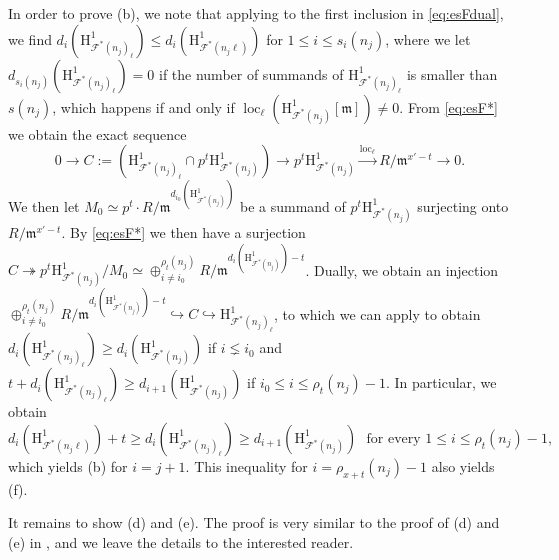 \documentclass[10pt,reqno]{amsart}
\numberwithin{equation}{section}
\theoremstyle{plain}
\theoremstyle{definition}
\theoremstyle{definition}
\theoremstyle{plain}
\theoremstyle{plain}
\theoremstyle{plain}
\theoremstyle{plain}
\theoremstyle{plain}
\theoremstyle{plain}
\DeclareMathOperator{\loc}{loc}
\newcommand{\Fcal}{\mathcal{F}}
\newcommand{\fm}{\mathfrak{m}}
\newcommand{\rH}{\mathrm{H}}
\begin{document}
In order to prove (b), we note that applying \cite[Lem. 3.3.9]{eisenstein} to the first inclusion in \eqref{eq:esFdual}, we find $d_i(\rH^1_{\Fcal^*(n_j)_{\ell}})\leq d_i(\rH^1_{\Fcal^*(n_j\ell)})$ for $1\leq i\leq s_i(n_j)$, where we let $d_{s_i(n_j)}(\rH^1_{\Fcal^*(n_j)_{\ell}})=0$ if the number of summands of $\rH^1_{\Fcal^*(n_j)_{\ell}}$ is smaller than $s(n_j)$, which happens if and only if $\loc_\ell(\rH^1_{\Fcal^*(n_j)}[\fm])\neq 0$.
From \eqref{eq:esF*} we obtain the exact sequence 
\[
0\to C:=(\rH^1_{\Fcal^*(n_j)_{\ell}}\cap p^t\rH^1_{\Fcal^*(n_j)}) \to p^t\rH^1_{\Fcal^*(n_j)} \xrightarrow{\loc_\ell} R/\fm^{x'-t} \to 0.
\]
We then let $M_0\simeq p^t \cdot R/\fm^{d_{i_0}(\rH^1_{\Fcal^*(n_j)})}$ be a summand of $p^t\rH^1_{\Fcal^*(n_j)}$ surjecting onto $R/\fm^{x'-t}$. By \eqref{eq:esF*}
we then have a surjection $C\twoheadrightarrow  p^t\rH^1_{\Fcal^*(n_j)}/M_0\simeq \oplus^{\rho_t(n_j)}_{i\neq i_0}R/\fm^{d_{i}(\rH^1_{\Fcal^*(n_j)})-t}$. 
Dually, we obtain an injection $ \oplus^{\rho_t(n_j)}_{i\neq i_0}R/\fm^{d_{i}(\rH^1_{\Fcal^*(n_j)})-t} \hookrightarrow C\hookrightarrow \rH^1_{\Fcal^*(n_j)_{\ell}}$, to which we can apply \cite[Lem. 3.3.9]{eisenstein} to obtain $d_i(\rH^1_{\Fcal^*(n_j)_{\ell}})\geq d_i(\rH^1_{\Fcal^*(n_j)})$ if $i\lneq i_0$ and $t+d_i(\rH^1_{\Fcal^*(n_j)_{\ell}})\geq d_{i+1}(\rH^1_{\Fcal^*(n_j)})$ if $i_0\leq i\leq \rho_t(n_j)-1$. In particular, we obtain
\[
 d_i(\rH^1_{\Fcal^*(n_j\ell)}) +t \geq d_i(\rH^1_{\Fcal^*(n_j)_{\ell}}) \geq d_{i+1}(\rH^1_{\Fcal^*(n_j)}) \ \ \ \text{for every } 1\leq i\leq \rho_t(n_j)-1,
\]
which yields (b) for $i=j+1$. This inequality for $i=\rho_{x+t}(n_{j})-1$ also yields (f).

It remains to show (d) and (e). The proof is very similar to the proof of (d) and (e) in \cite[$\S$3.3.3]{eisenstein}, and we leave the details to the interested reader. 




\end{document}
